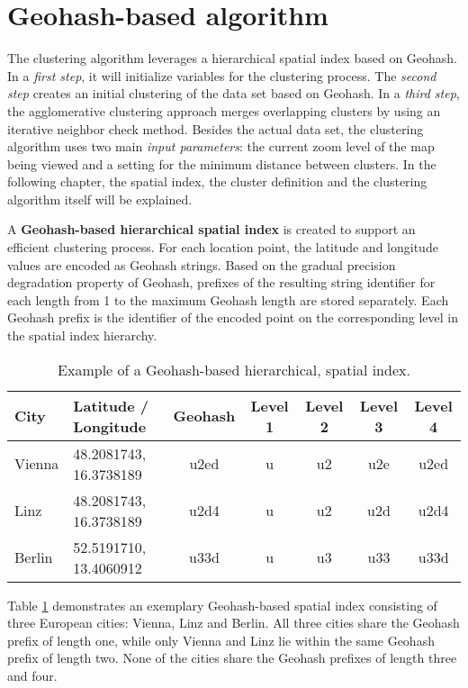 
%
%

\section{Geohash-based algorithm}
\label{chapter:algorithm}

The clustering algorithm leverages a hierarchical spatial index based on Geohash. In a \textit{first step}, it will initialize variables for the clustering process. The \textit{second step} creates an initial clustering of the data set based on Geohash. In a \textit{third step}, the agglomerative clustering approach merges overlapping clusters by using an iterative neighbor check method. Besides the actual data set, the clustering algorithm uses two main \textit{input parameters}: the current zoom level of the map being viewed and a setting for the minimum distance between clusters. In the following chapter, the spatial index, the cluster definition and the clustering algorithm itself will be explained.

A \textbf{Geohash-based hierarchical spatial index} is created to support an efficient clustering process. For each location point, the latitude and longitude values are encoded as Geohash strings. Based on the gradual precision degradation property of Geohash, prefixes of the resulting string identifier for each length from 1 to the maximum Geohash length are stored separately. Each Geohash prefix is the identifier of the encoded point on the corresponding level in the spatial index hierarchy. 

\begin{table}[ht]
\begin{center}
\begin{tabular}{ |l|l|c|c|c|c|c| }
  \hline
  City & Latitude / Longitude & Geohash & Level 1 & Level 2 & Level 3 & Level 4  \\
  \hline
  Vienna & 48.2081743, 16.3738189 & u2ed & u & u2 & u2e & u2ed \\
  Linz   & 48.2081743, 16.3738189 & u2d4 & u & u2 & u2d & u2d4 \\
  Berlin & 52.5191710, 13.4060912 & u33d & u & u3 & u33 & u33d \\
  \hline
\end{tabular}
\caption{Example of a Geohash-based hierarchical, spatial index.}
\label{table:algorithm-geohash}
\end{center}
\end{table}

Table \ref{table:algorithm-geohash} demonstrates an exemplary Geohash-based spatial index consisting of three European cities: Vienna, Linz and Berlin. All three cities share the Geohash prefix of length one, while only Vienna and Linz lie within the same Geohash prefix of length two. None of the cities share the Geohash prefixes of length three and four.

